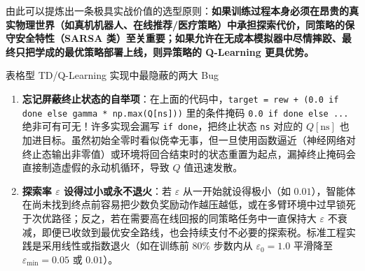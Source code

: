 由此可以提炼出一条极具实战价值的选型原则：\textbf{如果训练过程本身必须在昂贵的真实物理世界（如真机机器人、在线推荐/医疗策略）中承担探索代价，同策略的保守安全特性（SARSA 类）至关重要；如果允许在无成本模拟器中尽情摔跤、最终只把学成的最优策略部署上线，则异策略的 Q-Learning 更具优势。}

\begin{failBox}{表格型 TD/Q-Learning 实现中最隐蔽的两大 Bug}
\begin{enumerate}
  \item \textbf{忘记屏蔽终止状态的自举项}：在上面的代码中，\texttt{target = rew + (0.0 if done else gamma * np.max(Q[ns]))} 里的条件掩码 \texttt{0.0 if done else ...} 绝非可有可无！许多实现会漏写 \texttt{if done}，把终止状态 \texttt{ns} 对应的 $Q[\text{ns}]$ 也加进目标。虽然初始全零时看似侥幸无事，但一旦使用函数逼近（神经网络对终止态输出非零值）或环境将回合结束时的状态重置为起点，漏掉终止掩码会直接制造虚假的永动机循环，导致 $Q$ 值迅速发散。
  \item \textbf{探索率 $\varepsilon$ 设得过小或永不退火}：若 $\varepsilon$ 从一开始就设得极小（如 $0.01$），智能体在尚未找到终点前容易把少数负奖励动作越压越低，或在多臂环境中过早锁死于次优路径；反之，若在需要高在线回报的同策略任务中一直保持大 $\varepsilon$ 不衰减，即便已收敛到最优安全路线，也会持续支付不必要的探索税。标准工程实践是采用线性或指数退火（如在训练前 80\% 步数内从 $\varepsilon_0 = 1.0$ 平滑降至 $\varepsilon_{\min} = 0.05$ 或 $0.01$）。
\end{enumerate}
\end{failBox}

